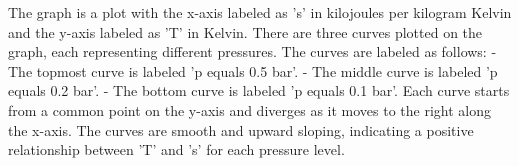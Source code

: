 The graph is a plot with the x-axis labeled as 's' in kilojoules per kilogram Kelvin and the y-axis labeled as 'T' in Kelvin. There are three curves plotted on the graph, each representing different pressures. The curves are labeled as follows:
- The topmost curve is labeled 'p equals 0.5 bar'.
- The middle curve is labeled 'p equals 0.2 bar'.
- The bottom curve is labeled 'p equals 0.1 bar'.
Each curve starts from a common point on the y-axis and diverges as it moves to the right along the x-axis. The curves are smooth and upward sloping, indicating a positive relationship between 'T' and 's' for each pressure level.